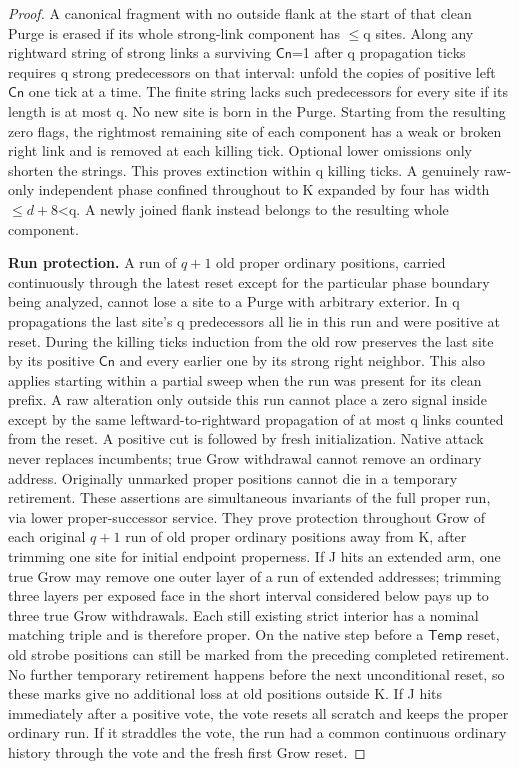 \begin{proof}
A canonical fragment with no outside flank at the start of that clean Purge is erased if its whole strong-link component has \(\le\)q sites. Along any rightward string of strong links a surviving \(\mathsf{Cn}\)=1 after q propagation ticks requires q strong predecessors on that interval: unfold the copies of positive left \(\mathsf{Cn}\) one tick at a time. The finite string lacks such predecessors for every site if its length is at most q. No new site is born in the Purge. Starting from the resulting zero flags, the rightmost remaining site of each component has a weak or broken right link and is removed at each killing tick. Optional lower omissions only shorten the strings. This proves extinction within q killing ticks. A genuinely raw-only independent phase confined throughout to K expanded by four has width \(\le\)\(d+8\)\textless{}q. A newly joined flank instead belongs to the resulting whole component.

\textbf{Run protection.} A run of \(q+1\) old proper ordinary positions, carried continuously through the latest reset except for the particular phase boundary being analyzed, cannot lose a site to a Purge with arbitrary exterior. In q propagations the last site's q predecessors all lie in this run and were positive at reset. During the killing ticks induction from the old row preserves the last site by its positive \(\mathsf{Cn}\) and every earlier one by its strong right neighbor. This also applies starting within a partial sweep when the run was present for its clean prefix. A raw alteration only outside this run cannot place a zero signal inside except by the same leftward-to-rightward propagation of at most q links counted from the reset. A positive cut is followed by fresh initialization. Native attack never replaces incumbents; true Grow withdrawal cannot remove an ordinary address. Originally unmarked proper positions cannot die in a temporary retirement. These assertions are simultaneous invariants of the full proper run, via lower proper-successor service. They prove protection throughout Grow of each original \(q+1\) run of old proper ordinary positions away from K, after trimming one site for initial endpoint properness. If J hits an extended arm, one true Grow may remove one outer layer of a run of extended addresses; trimming three layers per exposed face in the short interval considered below pays up to three true Grow withdrawals. Each still existing strict interior has a nominal matching triple and is therefore proper. On the native step before a \(\mathsf{Temp}\) reset, old strobe positions can still be marked from the preceding completed retirement. No further temporary retirement happens before the next unconditional reset, so these marks give no additional loss at old positions outside K. If J hits immediately after a positive vote, the vote resets all scratch and keeps the proper ordinary run. If it straddles the vote, the run had a common continuous ordinary history through the vote and the fresh first Grow reset.


\end{proof}
